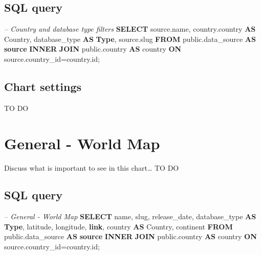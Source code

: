 \documentclass[]{book}
\newenvironment{Shaded}{\begin{snugshade}}{\end{snugshade}}
\newcommand{\KeywordTok}[1]{\textcolor[rgb]{0.13,0.29,0.53}{\textbf{#1}}}
\newcommand{\CommentTok}[1]{\textcolor[rgb]{0.56,0.35,0.01}{\textit{#1}}}
\newcommand{\NormalTok}[1]{#1}
\begin{document}
\subsection{SQL query}\label{sql-query-1}

\begin{Shaded}
\begin{Highlighting}[]
\CommentTok{--  Country and database type filters}
\KeywordTok{SELECT}\NormalTok{ source.name, }
\NormalTok{       country.country }\KeywordTok{AS}\NormalTok{ Country, }
\NormalTok{       database_type }\KeywordTok{AS} \KeywordTok{Type}\NormalTok{,}
\NormalTok{       source.slug}
\KeywordTok{FROM}\NormalTok{ public.data_source }\KeywordTok{AS} \KeywordTok{source} \KeywordTok{INNER} \KeywordTok{JOIN}\NormalTok{ public.country }
    \KeywordTok{AS}\NormalTok{ country }\KeywordTok{ON}\NormalTok{ source.country_id=country.id;}
\end{Highlighting}
\end{Shaded}

\subsection{Chart settings}\label{chart-settings-1}

TO DO

\section{General - World Map}\label{general---world-map}

Discuss what is important to see in this chart\ldots{} TO DO

\subsection{SQL query}\label{sql-query-2}

\begin{Shaded}
\begin{Highlighting}[]
\CommentTok{--    General - World Map}
\KeywordTok{SELECT}\NormalTok{  name,}
\NormalTok{        slug,}
\NormalTok{        release_date,}
\NormalTok{        database_type }\KeywordTok{AS} \KeywordTok{Type}\NormalTok{,}
\NormalTok{        latitude,}
\NormalTok{        longitude,}
        \KeywordTok{link}\NormalTok{,}
\NormalTok{        country }\KeywordTok{AS}\NormalTok{ Country,}
\NormalTok{        continent}
\KeywordTok{FROM}\NormalTok{ public.data_source }\KeywordTok{AS} \KeywordTok{source} \KeywordTok{INNER} \KeywordTok{JOIN}\NormalTok{ public.country }
    \KeywordTok{AS}\NormalTok{ country }\KeywordTok{ON}\NormalTok{ source.country_id=country.id;}
\end{Highlighting}
\end{Shaded}
\end{document}
